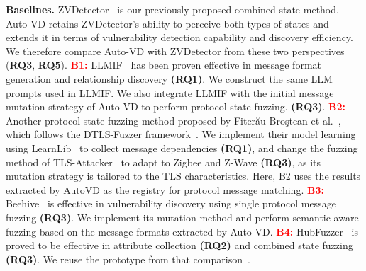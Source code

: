 \documentclass[10pt,journal,compsoc]{IEEEtran}
\DeclareRobustCommand{\rq}[1]{\textcolor{rqcolor}{\textbf{RQ#1}}}
\newcommand{\parab}[1]{\vspace{0.04in}\noindent\textbf{#1}}
\begin{document}
\parab{Baselines.}
ZVDetector~\cite{zvdetector} is our previously proposed combined-state method. Auto-VD retains ZVDetector's ability to perceive both types of states and extends it in terms of vulnerability detection capability and discovery efficiency. We therefore compare Auto-VD with ZVDetector from these two perspectives (\rq{3}, \rq{5}).
\textcolor{red}{\textbf{B1:}} LLMIF~\cite{llmif} has been proven effective in message format generation and relationship discovery \textbf{(\rq{1})}. We construct the same LLM prompts used in LLMIF. We also integrate LLMIF with the initial message mutation strategy of Auto-VD to perform protocol state fuzzing. \textbf{(\rq{3})}.
\textcolor{red}{\textbf{B2:}} Another protocol state fuzzing method proposed by Fiter\u{a}u-Bro\c{s}tean et al.~\cite{fiterau2020analysis,fiterau2023automata}, which follows the DTLS-Fuzzer framework~\cite{fiterau2023automata}. We implement their model learning using LearnLib~\cite{learnlib} to collect message dependencies \textbf{(\rq{1})}, and change the fuzzing method of TLS-Attacker~\cite{tlsattacker} to adapt to Zigbee and Z-Wave \textbf{(\rq{3})}, as its mutation strategy is tailored to the TLS characteristics. Here, B2 uses the results extracted by AutoVD as the registry for protocol message matching.
\textcolor{red}{\textbf{B3:}} Beehive~\cite{wang2022don} is effective in vulnerability discovery using single protocol message fuzzing \textbf{(\rq{3})}. We implement its mutation method and perform semantic-aware fuzzing based on the message formats extracted by Auto-VD.
\textcolor{red}{\textbf{B4:}} HubFuzzer~\cite{ma2023no} is proved to be effective in attribute collection \textbf{(\rq{2})} and combined state fuzzing \textbf{(\rq{3})}. We reuse the prototype from that comparison~\cite{zvdetector}.

\end{document}
